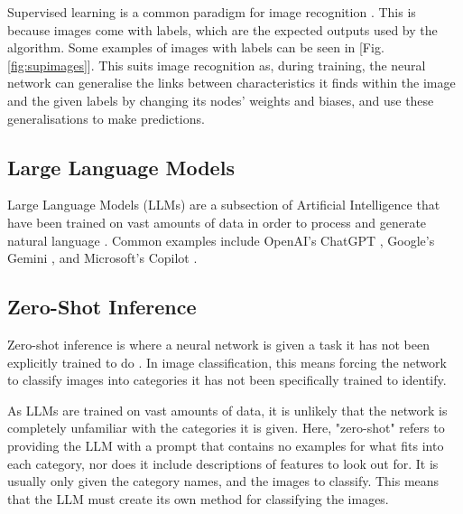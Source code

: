 \documentclass{article}
\begin{document}
Supervised learning is a common paradigm for image recognition \cite{krizhevsky2012imagenet}. This is because images come with labels, which are the expected outputs used by the algorithm. Some examples of images with labels can be seen in [Fig. \ref{fig:supimages}]. This suits image recognition as, during training, the neural network can generalise the links between characteristics it finds within the image and the given labels by changing its nodes' weights and biases, and use these generalisations to make predictions.


\subsection{Large Language Models}
Large Language Models (LLMs) are a subsection of Artificial Intelligence that have been trained on vast amounts of data in order to process and generate natural language \cite{bommasani2022opportunitiesrisksfoundationmodels}. Common examples include OpenAI's ChatGPT \cite{ChatGPT}, Google's Gemini \cite{Gemini}, and Microsoft's Copilot \cite{Copilot}.


\subsection{Zero-Shot Inference}
Zero-shot inference is where a neural network is given a task it has not been explicitly trained to do \cite{mehta2025generalizationtheoryzeroshotprediction}. In image classification, this means forcing the network to classify images into categories it has not been specifically trained to identify.

As LLMs are trained on vast amounts of data, it is unlikely that the network is completely unfamiliar with the categories it is given. Here, "zero-shot" refers to providing the LLM with a prompt that contains no examples for what fits into each category, nor does it include descriptions of features to look out for. It is usually only given the category names, and the images to classify. This means that the LLM must create its own method for classifying the images.
\end{document}
